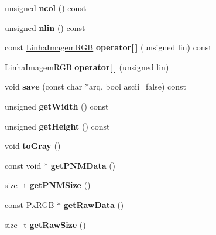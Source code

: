 \begin{DoxyCompactItemize}
\item 
unsigned {\bfseries ncol} () const \hypertarget{classImagemRGB_aa434ab7e3e65191f7d5dd30ebac2374b}{}\label{classImagemRGB_aa434ab7e3e65191f7d5dd30ebac2374b}

\item 
unsigned {\bfseries nlin} () const \hypertarget{classImagemRGB_aef46088192e1fd2e2ed52e92153fd417}{}\label{classImagemRGB_aef46088192e1fd2e2ed52e92153fd417}

\item 
const \hyperlink{classLinhaImagemRGB}{Linha\+Imagem\+R\+GB} {\bfseries operator\mbox{[}$\,$\mbox{]}} (unsigned lin) const \hypertarget{classImagemRGB_a9bf42f6cc252329baca1f1510c92c51b}{}\label{classImagemRGB_a9bf42f6cc252329baca1f1510c92c51b}

\item 
\hyperlink{classLinhaImagemRGB}{Linha\+Imagem\+R\+GB} {\bfseries operator\mbox{[}$\,$\mbox{]}} (unsigned lin)\hypertarget{classImagemRGB_a43499e8f30f6be6cfab05ce0d416ee47}{}\label{classImagemRGB_a43499e8f30f6be6cfab05ce0d416ee47}

\item 
void {\bfseries save} (const char $\ast$arq, bool ascii=false) const \hypertarget{classImagemRGB_ae360acc57a7168426cec425d00db441b}{}\label{classImagemRGB_ae360acc57a7168426cec425d00db441b}

\item 
unsigned {\bfseries get\+Width} () const \hypertarget{classImagemRGB_a8730aabd7d33fdb832999afd1dffa923}{}\label{classImagemRGB_a8730aabd7d33fdb832999afd1dffa923}

\item 
unsigned {\bfseries get\+Height} () const \hypertarget{classImagemRGB_a4db135de74096141c367d9da3ca33d31}{}\label{classImagemRGB_a4db135de74096141c367d9da3ca33d31}

\item 
void {\bfseries to\+Gray} ()\hypertarget{classImagemRGB_abd1b5dd0d06d0e88e3dcd042e7282f33}{}\label{classImagemRGB_abd1b5dd0d06d0e88e3dcd042e7282f33}

\item 
const void $\ast$ {\bfseries get\+P\+N\+M\+Data} ()\hypertarget{classImagemRGB_a30d5b4a07e2ecd65211c7c1337e26e35}{}\label{classImagemRGB_a30d5b4a07e2ecd65211c7c1337e26e35}

\item 
size\+\_\+t {\bfseries get\+P\+N\+M\+Size} ()\hypertarget{classImagemRGB_a9e1933ae19444242a2483bdc9233d711}{}\label{classImagemRGB_a9e1933ae19444242a2483bdc9233d711}

\item 
const \hyperlink{classPxRGB}{Px\+R\+GB} $\ast$ {\bfseries get\+Raw\+Data} ()\hypertarget{classImagemRGB_a9321e22997a503eb5dbc9778ef9ea5f7}{}\label{classImagemRGB_a9321e22997a503eb5dbc9778ef9ea5f7}

\item 
size\+\_\+t {\bfseries get\+Raw\+Size} ()\hypertarget{classImagemRGB_a45b47c7cc62430f8c921a5d28ee30cf4}{}\label{classImagemRGB_a45b47c7cc62430f8c921a5d28ee30cf4}

\end{DoxyCompactItemize}
